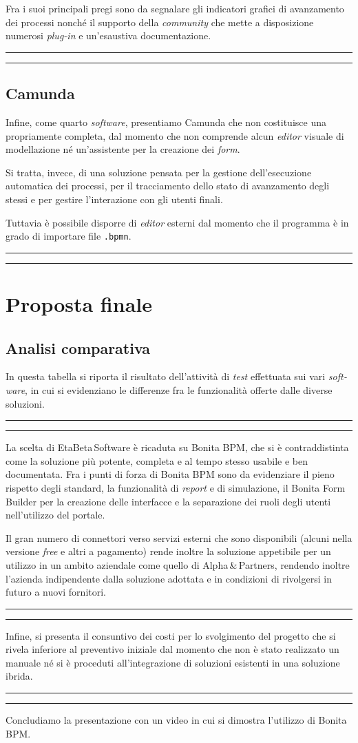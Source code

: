 \documentclass[a4paper,10pt]{article}
\newcommand{\inglese}[1]{\foreignlanguage{english}{\textit{#1}}}
\newcommand{\team}{\textsf{EtaBeta\,Software}\xspace}
\newcommand{\sw}{\inglese{software}\xspace}
\newcommand{\customer}{\textsf{Alpha\,\&\,Partners}\xspace}
\newcommand{\cambioslide}{%
\begin{center}
\Large
\rule[4pt]{0.2\linewidth}{.7pt} \ding{167} \rule[4pt]{0.2\linewidth}{.7pt}
\end{center}
}
\newcommand{\ele}{%
\begin{center}
\fbox{$\mathcal{ELENA}$}
\end{center}
}
\begin{document}
Fra i suoi principali pregi sono da segnalare gli indicatori grafici di avanzamento dei processi nonché il supporto della \inglese{community} che mette a disposizione numerosi \inglese{plug-in} e un'esaustiva documentazione.
\cambioslide

\subsection{Camunda}
Infine, come quarto \sw, presentiamo Camunda che non costituisce una propriamente completa, dal momento che non comprende alcun \inglese{editor} visuale di modellazione né un'assistente per la creazione dei \inglese{form}.

Si tratta, invece, di una soluzione pensata per la gestione dell'esecuzione automatica dei processi, per il tracciamento dello stato di avanzamento degli stessi e per gestire l'interazione con gli utenti finali.

Tuttavia è possibile disporre di \inglese{editor} esterni dal momento che il programma è in grado di importare file \texttt{.bpmn}.

\cambioslide

\ele

\section{Proposta finale}

\subsection{Analisi comparativa}
In questa tabella si riporta il risultato dell'attività di \inglese{test} effettuata sui vari \sw, in cui si evidenziano le differenze fra le funzionalità offerte dalle diverse soluzioni.

\cambioslide

La scelta di \team è ricaduta su Bonita BPM, che si è contraddistinta come la soluzione più potente, completa e al tempo stesso usabile e ben documentata. Fra i punti di forza di Bonita BPM sono da evidenziare il pieno rispetto degli standard, la funzionalità di \inglese{report} e di simulazione, il Bonita Form Builder per la creazione delle interfacce e la separazione dei ruoli degli utenti nell'utilizzo del portale.

Il gran numero di connettori verso servizi esterni che sono disponibili (alcuni nella versione \inglese{free} e altri a pagamento) rende inoltre la soluzione appetibile per un utilizzo in un ambito aziendale come quello di \customer, rendendo inoltre l'azienda indipendente dalla soluzione adottata e in condizioni di rivolgersi in futuro a nuovi fornitori.

\cambioslide

Infine, si presenta il consuntivo dei costi per lo svolgimento del progetto che si rivela inferiore al preventivo iniziale dal momento che non è stato realizzato un manuale né si è proceduti all'integrazione di soluzioni esistenti in una soluzione ibrida.

\cambioslide

Concludiamo la presentazione con un video in cui si dimostra l'utilizzo di Bonita BPM.
\end{document}
